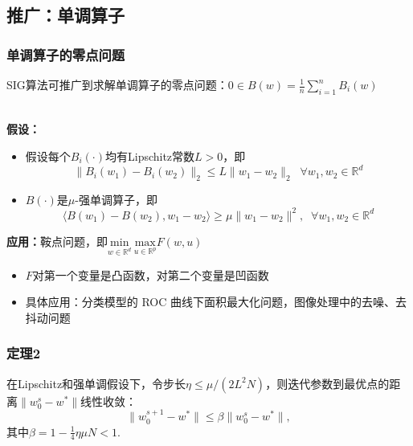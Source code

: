 \subsection{推广：单调算子}
  \frame
  {
    \frametitle{单调算子的零点问题}
    \footnotesize
    SIG算法可推广到求解单调算子的零点问题：$0 \in B(w) = \frac{1}{n}\sum_{i=1}^n B_i(w)$ \\~\\

    \pause

    \textbf{假设：}
    \begin{itemize}
        \item 假设每个$B_i(\cdot)$均有Lipschitz常数$L > 0$，即
        $$
        \| B_i(w_1) - B_i(w_2) \|_2 \le L \| w_1 - w_2 \|_2 \;\; \forall w_1, w_2 \in \mathbb{R}^d
        $$
        \item $B(\cdot)$是$\mu$-强单调算子，即
        $$
        \langle B(w_1) - B(w_2), w_1 - w_2 \rangle \ge \mu \| w_1 - w_2 \|^2, \;\; \forall w_1, w_2 \in \mathbb{R}^d
        $$
    \end{itemize}

    \pause
    \begin{block}{}
    \textbf{应用：}鞍点问题，即$\underset{w \in \mathbb{R}^d}{\text{min}} \ \underset{u \in \mathbb{R}^p}{\text{max}} F(w, u)$
    \begin{itemize}
        \item $F$对第一个变量是凸函数，对第二个变量是凹函数
        \item 具体应用：分类模型的 ROC 曲线下面积最大化问题，图像处理中的去噪、去抖动问题
    \end{itemize}
    \end{block}
  }

  \frame
  {
    \frametitle{定理2}
    \begin{block}{}
    在Lipschitz和强单调假设下，令步长$\eta \le \mu/(2L^2N)$，则迭代参数到最优点的距离$\|w_0^s - w^*\|$线性收敛：
    $$
    \| w_0^{s+1} - w^* \| \le \beta \| w_0^{s} - w^* \|,
    $$
    其中$\beta = 1 - \frac{1}{4} \eta \mu N < 1$.
    \end{block}
  }
